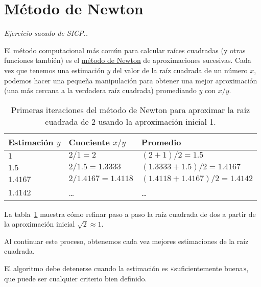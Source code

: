 \section{Método de Newton}

\emph{
  Ejercicio sacado de \emph{SICP}.\footnotemark.
}

El método computacional más común para calcular raíces cuadradas
(y otras funciones también) es el
\href{http://es.wikipedia.org/wiki/M\%C3\%A9todo\_de\_Newton}{método de Newton}
de aproximaciones sucesivas. Cada vez que tenemos una estimación
\(y\) del valor de la raíz cuadrada de un número \(x\), podemos hacer una
pequeña manipulación para obtener una mejor aproximación (una más
cercana a la verdadera raíz cuadrada) promediando \(y\) con \(x/y\).

\begin{table}
  \centering
  \begin{tabular}{lll}
    \toprule
      Estimación \(y\) & Cuociente \(x/y\)     & Promedio \\
    \midrule
      \(1\)            & \(2/1      = 2\)      & \((2 + 1)          /2 = 1.5\)    \\
      \(1.5\)          & \(2/1.5    = 1.3333\) & \((1.3333 + 1.5 )  /2 = 1.4167\) \\
      \(1.4167\)       & \(2/1.4167 = 1.4118\) & \((1.4118 + 1.4167)/2 = 1.4142\) \\
      \(1.4142\)       & \ldots{}              & \ldots{} \\
    \bottomrule
  \end{tabular}
  \caption{Primeras iteraciones del método de Newton para aproximar la raíz cuadrada de 2
    usando la aproximación inicial 1.}
  \label{tbl:iteraciones-newton}
\end{table}

La tabla~\ref{tbl:iteraciones-newton} muestra cómo refinar paso a paso
la raíz cuadrada de dos a partir de la aproximación inicial \(\sqrt{2}\approx 1\).

Al continuar este proceso, obtenemos cada vez mejores estimaciones de la
raíz cuadrada.

El algoritmo debe detenerse cuando la estimación es «suficientemente
buena», que puede ser cualquier criterio bien definido.

